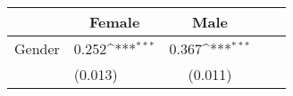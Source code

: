 {
\def\sym#1{\ifmmode^{#1}\else\(^{#1}\)\fi}
\begin{tabular*}{.4\hsize}{@{\hskip\tabcolsep\extracolsep\fill}l*{2}{lc}}
\toprule
                &\multicolumn{1}{c}{Female}&\multicolumn{1}{c}{Male}\\
\midrule
Gender          &    0.252\sym{***}&    0.367\sym{***}\\
                &  (0.013)         &  (0.011)         \\
\bottomrule
\end{tabular*}
}
